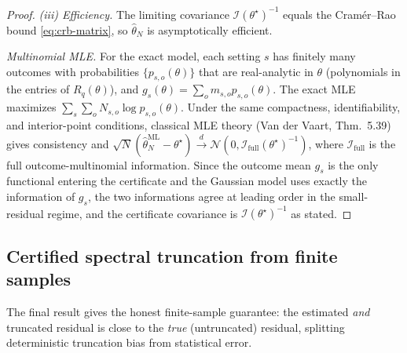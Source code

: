 \documentclass[aps,prresearch,reprint,superscriptaddress,nofootinbib,amsmath,amssymb]{revtex4-2}
\begin{document}
\begin{proof}
\emph{(iii) Efficiency.} The limiting covariance $\mathcal{I}(\theta^\star)^{-1}$ equals the Cram\'er--Rao bound \eqref{eq:crb-matrix}, so $\hat\theta_N$ is asymptotically efficient.

\emph{Multinomial MLE.} For the exact model, each setting $s$ has finitely many outcomes with probabilities $\{p_{s,o}(\theta)\}$ that are real-analytic in $\theta$ (polynomials in the entries of $R_q(\theta)$), and $g_s(\theta)=\sum_o m_{s,o}p_{s,o}(\theta)$. The exact MLE maximizes $\sum_s\sum_o N_{s,o}\log p_{s,o}(\theta)$. Under the same compactness, identifiability, and interior-point conditions, classical MLE theory (Van der Vaart, Thm.~5.39) gives consistency and $\sqrt N(\hat\theta^{\mathrm{ML}}_N-\theta^\star)\xrightarrow{d}\mathcal{N}(0,\mathcal{I}_{\mathrm{full}}(\theta^\star)^{-1})$, where $\mathcal{I}_{\mathrm{full}}$ is the full outcome-multinomial information. Since the outcome mean $g_s$ is the only functional entering the certificate and the Gaussian model uses exactly the information of $g_s$, the two informations agree at leading order in the small-residual regime, and the certificate covariance is $\mathcal{I}(\theta^\star)^{-1}$ as stated.
\end{proof}

\subsection{Certified spectral truncation from finite samples}
\label{app:inference-certified}

The final result gives the honest finite-sample guarantee: the estimated \emph{and} truncated residual is close to the \emph{true} (untruncated) residual, splitting deterministic truncation bias from statistical error.
\end{document}
